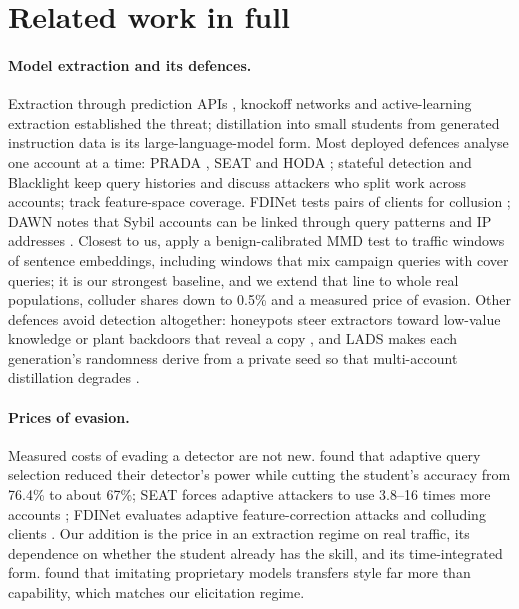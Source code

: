 \section{Related work in full}
\label{sec:related-full}

\paragraph{Model extraction and its defences.} Extraction through prediction APIs \citep{tramer2016stealing}, knockoff networks \citep{orekondy2019knockoff} and active-learning extraction \citep{pal2020activethief} established the threat; distillation into small students from generated instruction data \citep{hinton2015distilling,taori2023alpaca,yu2024metamath,wei2024magicoder} is its large-language-model form. Most deployed defences analyse one account at a time: PRADA \citep{juuti2019prada}, SEAT \citep{zhang2021seat} and HODA \citep{sadeghzadeh2023hoda}; stateful detection \citep{chen2020stateful} and Blacklight \citep{li2022blacklight} keep query histories and discuss attackers who split work across accounts; \citet{kesarwani2018model} track feature-space coverage. FDINet tests pairs of clients for collusion \citep{yao2023fdinet}; DAWN notes that Sybil accounts can be linked through query patterns and IP addresses \citep{szyller2021dawn}. Closest to us, \citet{liu2026embarrassingly} apply a benign-calibrated MMD test to traffic windows of sentence embeddings, including windows that mix campaign queries with cover queries; it is our strongest baseline, and we extend that line to whole real populations, colluder shares down to 0.5\% and a measured price of evasion. Other defences avoid detection altogether: honeypots steer extractors toward low-value knowledge \citep{dai2026knowledgetrap} or plant backdoors that reveal a copy \citep{wang2025honeypotnet}, and LADS makes each generation's randomness derive from a private seed so that multi-account distillation degrades \citep{diao2026lads}.

\paragraph{Prices of evasion.} Measured costs of evading a detector are not new. \citet{liu2026embarrassingly} found that adaptive query selection reduced their detector's power while cutting the student's accuracy from 76.4\% to about 67\%; SEAT forces adaptive attackers to use 3.8--16 times more accounts \citep{zhang2021seat}; FDINet evaluates adaptive feature-correction attacks and colluding clients \citep{yao2023fdinet}. Our addition is the price in an extraction regime on real traffic, its dependence on whether the student already has the skill, and its time-integrated form. \citet{gudibande2024false} found that imitating proprietary models transfers style far more than capability, which matches our elicitation regime.

